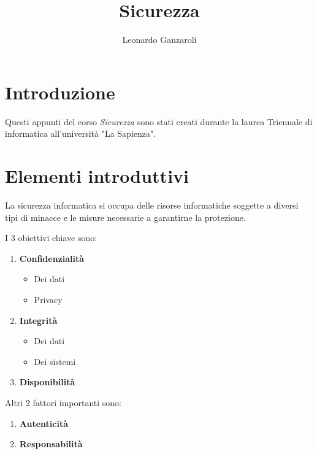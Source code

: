 \documentclass{article}
\title{Sicurezza}
\author{Leonardo Ganzaroli}
\date{}
\begin{document}
\maketitle


\tableofcontents

\newpage

\hypersetup{allcolors=black}

\section*{Introduzione}

Questi appunti del corso \textit{Sicurezza} sono stati creati durante la laurea Triennale di informatica all'università "La Sapienza".

\newpage

\section{Elementi introduttivi}

La sicurezza informatica si occupa delle risorse informatiche soggette a diversi tipi di minacce e le misure necessarie a garantirne la protezione.\newline

\noindent I 3 obiettivi chiave sono:
\begin{enumerate}
    \item \textbf{Confidenzialità}
        \begin{itemize}
            \item Dei dati
            \item Privacy
        \end{itemize}
    \item \textbf{Integrità}
        \begin{itemize}
            \item Dei dati
            \item Dei sistemi
        \end{itemize}
    \item \textbf{Disponibilità}\newline
\end{enumerate}

\noindent Altri 2 fattori importanti sono:
\begin{enumerate}
    \item \textbf{Autenticità}
    \item \textbf{Responsabilità}\newline
\end{enumerate}
\end{document}
